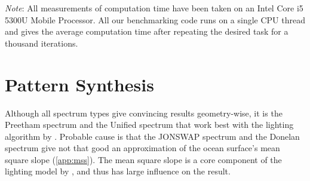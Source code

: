 

%
%
\emph{Note}: All measurements of computation time have been taken on an Intel
Core i5 5300U Mobile Processor. All our benchmarking code runs on a single
CPU thread and gives the average computation time after repeating the desired
task for a thousand iterations.
%
\section{Pattern Synthesis}
\label{sec:results:synthesis}
Although all spectrum types give convincing results geometry-wise, it is the
Preetham spectrum and the Unified spectrum that work best with the lighting
algorithm by \cite{article:oceanlighting}. Probable cause is that the JONSWAP
spectrum and the Donelan spectrum give not that good an approximation of the
ocean surface's mean square slope (\ref{app:mss}). The mean square slope is a
core component of the lighting model by \cite{article:oceanlighting}, and thus
has large influence on the result.

